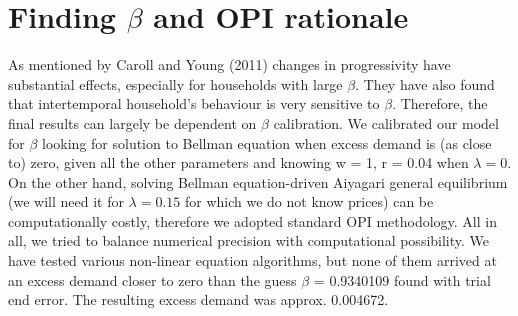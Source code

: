 \documentclass{article}
\begin{document}
\section*{Finding \(\beta\) and OPI rationale}

As mentioned by Caroll and Young (2011) changes in progressivity have substantial effects, especially for households with large \(\beta\). They have also found that intertemporal household's behaviour is very sensitive to \(\beta\). Therefore, the final results can largely be dependent on \(\beta\) calibration. We calibrated our model for \(\beta\) looking for solution to Bellman equation when excess demand is (as close to) zero, given all the other parameters and knowing w = 1, r = 0.04 when \(\lambda = 0\). On the other hand, solving Bellman equation-driven Aiyagari general equilibrium (we will need it for \(\lambda = 0.15\) for which we do not know prices) can be computationally costly, therefore we adopted standard OPI methodology. All in all, we tried to balance numerical precision with computational possibility. We have tested various non-linear equation algorithms, but none of them arrived at an excess demand closer to zero than the guess \(\beta\) = 0.9340109 found with trial end error. The resulting excess demand was approx. 0.004672.
\end{document}
